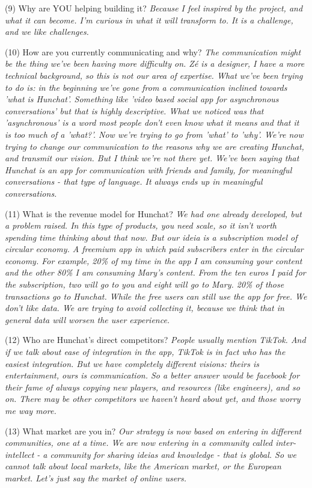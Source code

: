 \documentclass[11pt]{article}
\begin{document}
(9) Why are YOU helping building it? \textit{Because I feel inspired by the project, and what it can become. I'm curious in what it will transform to. It is a challenge, and we like challenges.}

(10) How are you currently communicating and why? \textit{The communication might be the thing we've been having more difficulty on. Zé is a designer, I have a more technical background, so this is not our area of expertise. What we've been trying to do is: in the beginning we've gone from a communication inclined towards 'what is Hunchat'. Something like 'video based social app for asynchronous conversations' but that is highly descriptive. What we noticed was that 'asynchronous' is a word most people don't even know what it means and that it is too much of a 'what?'. Now we're trying to go from 'what' to 'why'. We're now trying to change our communication to the reasons why we are creating Hunchat, and transmit our vision. But I think we're not there yet. We've been saying that Hunchat is an app for communication with friends and family, for meaningful conversations - that type of language. It always ends up in meaningful conversations.}

(11) What is the revenue model for Hunchat? \textit{We had one already developed, but a problem raised. In this type of products, you need scale, so it isn't worth spending time thinking about that now. But our ideia is a subscription model of circular economy.  A freemium app in which paid subscribers enter in the circular economy. For example, 20\% of my time in the app I am consuming your content and the other 80\% I am consuming Mary's content. From the ten euros I paid for the subscription, two will go to you and eight will go to Mary. 20\% of those transactions go to Hunchat. While the free users can still use the app for free. We don't like data. We are trying to avoid collecting it, because we think that in general data will worsen the user experience.}

(12) Who are Hunchat’s direct competitors? \textit{People usually mention TikTok. And if we talk about ease of integration in the app, TikTok is in fact who has the easiest integration. But we have completely different visions: theirs is entertainment, ours is communication. So a better answer would be facebook for their fame of always copying new players, and resources (like engineers), and so on. There may be other competitors we haven't heard about yet, and those worry me way more.}

(13) What market are you in? \textit{Our strategy is now based on entering in different communities, one at a time. We are now entering in a community called inter-intellect - a community for sharing ideias and knowledge - that is global.  So we cannot talk about local markets, like the American market, or the European market. Let's just say the market of online users.}
\end{document}
